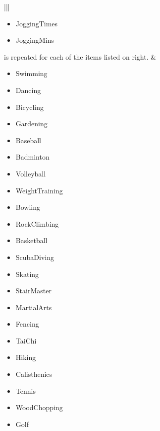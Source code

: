 \documentclass[letterpaper,10pt,english]{sphinxmanual}
\begin{document}
\begin{savenotes}
\begin{tabular}[t]{|*{2}{|}}
\begin{itemize}
\item {} 
JoggingTimes

\item {} 
JoggingMins

\end{itemize}

is repeated for each of the items listed on right.
&\begin{itemize}
\item {} 
Swimming

\item {} 
Dancing

\item {} 
Bicycling

\item {} 
Gardening

\item {} 
Baseball

\item {} 
Badminton

\item {} 
Volleyball

\item {} 
WeightTraining

\item {} 
Bowling

\item {} 
RockClimbing

\item {} 
Basketball

\item {} 
ScubaDiving

\item {} 
Skating

\item {} 
StairMaster

\item {} 
MartialArts

\item {} 
Fencing

\item {} 
TaiChi

\item {} 
Hiking

\item {} 
Calisthenics

\item {} 
Tennis

\item {} 
WoodChopping

\item {} 
Golf


\end{itemize}
\end{tabular}
\end{savenotes}
\end{document}
